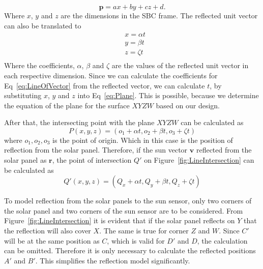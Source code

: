 \documentclass[letterpaper, 10 pt, conference]{ieeeconf}  %
\begin{document}
\begin{equation}
\mathbf{p} = ax + by + cz + d.
\label{eq:Plane}
\end{equation}
Where $x$, $y$ and $z$ are the dimensions in the SBC frame. The reflected unit vector can also be translated to 
\begin{equation}
\begin{aligned}
&	x = \alpha t \\
&	y = \beta t \\
&	z = \zeta t \\
\end{aligned}
\label{eq:LineOfVector}
\end{equation}
Where the coefficients, $\alpha$, $\beta$ and $\zeta$ are the values of the reflected unit vector in each respective dimension. Since we can calculate the coefficients for Eq~\ref{eq:LineOfVector} from the reflected vector, we can calculate $t$, by substituting $x$, $y$ and $z$ into Eq~\ref{eq:Plane}. This is possible, because we determine the equation of the plane for the surface $XYZW$ based on our design. 

After that, the intersecting point with the plane $XYZW$ can be calculated as
\begin{equation}
P(x, y, z) = (o_1 + \alpha t, o_2 + \beta t, o_3 + \zeta t)
\label{eq:Intersection}
\end{equation}
where $o_1, o_2, o_3$ is the point of origin. Which in this case is the position of reflection from the solar panel. Therefore, if the sun vector $\mathbf{v}$ reflected from the solar panel as $\mathbf{r}$, the point of intersection $Q'$ on Figure~\ref{fig:LineIntersection} can be calculated as
\begin{equation}
Q'(x, y, z) = (Q_x + \alpha t, Q_y + \beta t, Q_z + \zeta t)
\label{eq:SpecificIntersection}
\end{equation}

To model reflection from the solar panels to the sun sensor, only two corners of the solar panel and two corners of the sun sensor are to be considered. From Figure~\ref{fig:LineIntersection} it is evident that if the solar panel reflects on $Y$ that the reflection will also cover $X$. The same is true for corner $Z$ and $W$. Since $C'$ will be at the same position as $C$, which is valid for $D'$ and $D$, the calculation can be omitted. Therefore it is only necessary to calculate the reflected positions $A'$ and $B'$. This simplifies the reflection model significantly.
\end{document}
